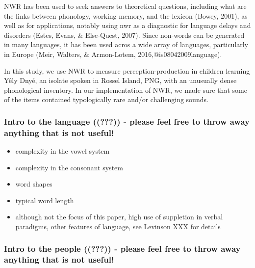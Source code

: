 \documentclass[english,,man,floatsintext]{apa6}
\providecommand{\tightlist}{%
  \setlength{\itemsep}{0pt}\setlength{\parskip}{0pt}}
\begin{document}
NWR has been used to seek answers to theoretical questions, including what are the links between phonology, working memory, and the lexicon (Bowey, 2001), as well as for applications, notably using nwr as a diagnostic for language delays and disorders (Estes, Evans, \& Else-Quest, 2007). Since non-words can be generated in many languages, it has been used acros a wide array of languages, particularly in Europe (Meir, Walters, \& Armon-Lotem, 2016,@is08042009language).

In this study, we use NWR to measure perception-production in children learning Yêly Dnyé, an isolate spoken in Rossel Island, PNG, with an unusually dense phonological inventory. In our implementation of NWR, we made sure that some of the items contained typologically rare and/or challenging sounds.

\hypertarget{intro-to-the-language-mc---please-feel-free-to-throw-away-anything-that-is-not-useful}{%
\subsubsection{\texorpdfstring{Intro to the language (({\textbf{???}})) - please feel free to throw away anything that is not useful!}{Intro to the language ((???)) - please feel free to throw away anything that is not useful!}}\label{intro-to-the-language-mc---please-feel-free-to-throw-away-anything-that-is-not-useful}}

\begin{itemize}
\tightlist
\item
  complexity in the vowel system
\item
  complexity in the consonant system
\item
  word shapes
\item
  typical word length
\item
  although not the focus of this paper, high use of suppletion in verbal paradigms, other features of language, see Levinson XXX for details
\end{itemize}

\hypertarget{intro-to-the-people-mc---please-feel-free-to-throw-away-anything-that-is-not-useful}{%
\subsubsection{\texorpdfstring{Intro to the people (({\textbf{???}})) - please feel free to throw away anything that is not useful!}{Intro to the people ((???)) - please feel free to throw away anything that is not useful!}}\label{intro-to-the-people-mc---please-feel-free-to-throw-away-anything-that-is-not-useful}}
\end{document}
